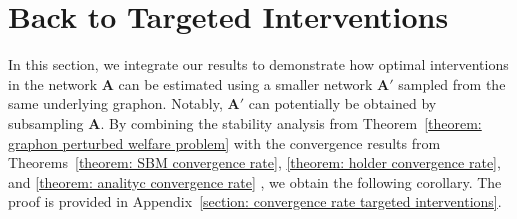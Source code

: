 \documentclass[11pt]{article}
\newcommand{\<}{\langle}
\renewcommand{\>}{\rangle}
\theoremstyle{plain}
\theoremstyle{definition}
\theoremstyle{remark}
\begin{document}
\section{Back to Targeted Interventions}\label{section:simulations}
 In this section, we integrate our results to demonstrate how optimal interventions in the network \( \mathbf{A} \) can be estimated using a smaller network \( \mathbf{A}' \) sampled from the same underlying graphon. Notably, \( \mathbf{A}' \) can potentially be obtained by subsampling \( \mathbf{A} \).  
By combining the stability analysis from Theorem~\ref{theorem: graphon perturbed welfare problem} with the convergence results from Theorems~\ref{theorem: SBM convergence rate}, \ref{theorem: holder convergence rate}, and \ref{theorem: analityc convergence rate} , we obtain the following corollary. The proof is provided in Appendix~\ref{section: convergence rate targeted interventions}.
\end{document}
